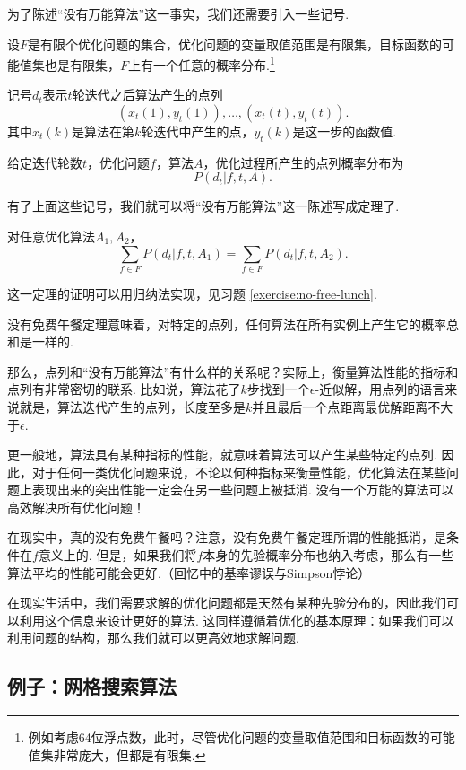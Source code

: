 为了陈述“没有万能算法”这一事实，我们还需要引入一些记号. 

设$F$是有限个优化问题的集合，优化问题的变量取值范围是有限集，目标函数的可能值集也是有限集，$F$上有一个任意的概率分布.\footnote{例如考虑64位浮点数，此时，尽管优化问题的变量取值范围和目标函数的可能值集非常庞大，但都是有限集.}

记号$d_t$表示$t$轮迭代之后算法产生的点列
\[(x_t(1),y_t(1)),\dots,(x_t(t),y_t(t)).\]
其中$x_t(k)$是算法在第$k$轮迭代中产生的点，$y_t(k)$是这一步的函数值.

给定迭代轮数$t$，优化问题$f$，算法$A$，优化过程所产生的点列概率分布为
\[P(d_t|f,t,A).\]

有了上面这些记号，我们就可以将“没有万能算法”这一陈述写成定理了. 

\begin{theorem}\label{theorem:no-free-lunch}
对任意优化算法$A_1,A_2$，
    \[\sum_{f\in F} P(d_t|f,t,A_1)=\sum_{f\in F} P(d_t|f,t,A_2).\]
\end{theorem}

这一定理的证明可以用归纳法实现，见习题 \ref{exercise:no-free-lunch}.

没有免费午餐定理意味着，对特定的点列，任何算法在所有实例上产生它的概率总和是一样的. 

那么，点列和“没有万能算法”有什么样的关系呢？实际上，衡量算法性能的指标和点列有非常密切的联系. 比如说，算法花了$k$步找到一个$\epsilon$-近似解，用点列的语言来说就是，算法迭代产生的点列，长度至多是$k$并且最后一个点距离最优解距离不大于$\epsilon$. 

更一般地，算法具有某种指标的性能，就意味着算法可以产生某些特定的点列. 因此，对于任何一类优化问题来说，不论以何种指标来衡量性能，优化算法在某些问题上表现出来的突出性能一定会在另一些问题上被抵消. 没有一个万能的算法可以高效解决所有优化问题！

\begin{remark}
    在现实中，真的没有免费午餐吗？注意，没有免费午餐定理所谓的性能抵消，是条件在$f$意义上的. 但是，如果我们将$f$本身的先验概率分布也纳入考虑，那么有一些算法平均的性能可能会更好.（回忆中的基率谬误与Simpson悖论）
    
    在现实生活中，我们需要求解的优化问题都是天然有某种先验分布的，因此我们可以利用这个信息来设计更好的算法. 这同样遵循着优化的基本原理：如果我们可以利用问题的结构，那么我们就可以更高效地求解问题.
\end{remark}

\subsection{例子：网格搜索算法}

